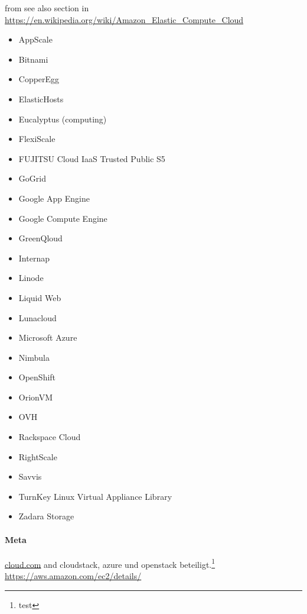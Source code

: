 \documentclass[a4paper,10pt]{article}
\numberwithin{figure}{section}
\numberwithin{table}{section}
\begin{document}
 from see also section in \url{https://en.wikipedia.org/wiki/Amazon_Elastic_Compute_Cloud}
\begin{itemize}
	\item AppScale
	\item Bitnami
	\item CopperEgg
	\item ElasticHosts
	\item Eucalyptus (computing)
	\item FlexiScale
	\item FUJITSU Cloud IaaS Trusted Public S5
	\item GoGrid
	\item Google App Engine
	\item Google Compute Engine
	\item GreenQloud
	\item Internap
	\item Linode
	\item Liquid Web
	\item Lunacloud
	\item Microsoft Azure
	\item Nimbula
	\item OpenShift
	\item OrionVM
	\item OVH
	\item Rackspace Cloud
	\item RightScale
	\item Savvis
	\item TurnKey Linux Virtual Appliance Library
	\item Zadara Storage
\end{itemize}

\paragraph{Meta}

\url{cloud.com} and cloudstack, azure und openstack beteiligt.\footnote{test}
\url{https://aws.amazon.com/ec2/details/}
\end{document}
